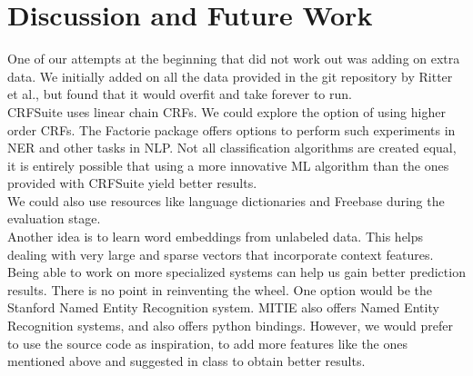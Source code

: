 \documentclass[a4paper]{article}
\begin{document}
\section{Discussion and Future Work}

One of our attempts at the beginning that did not work out was adding on extra data. We initially added on all the data provided in the git repository by Ritter et al., but found that it would overfit and take forever to run. \\

CRFSuite uses linear chain CRFs. We could explore the option of using higher order CRFs. The Factorie package offers options to perform such experiments in NER and other tasks in NLP.  Not all classification algorithms are created equal\cite{springer1}, it is entirely possible that using a more innovative ML algorithm than the ones provided with CRFSuite yield better results. \\

We could also use resources like language dictionaries and Freebase during the evaluation stage. \\

Another idea is to learn word embeddings from unlabeled data. This helps dealing with very large and sparse vectors that incorporate context features. \\

Being able to work on more specialized systems can help us gain better prediction results. There is no point in reinventing the wheel. One option would be the Stanford Named Entity Recognition system. MITIE also offers Named Entity Recognition systems, and also offers python bindings. However, we would prefer to use the source code as inspiration, to add more features like the ones mentioned above and suggested in class to obtain better results. \\


\printbibliography
\end{document}
